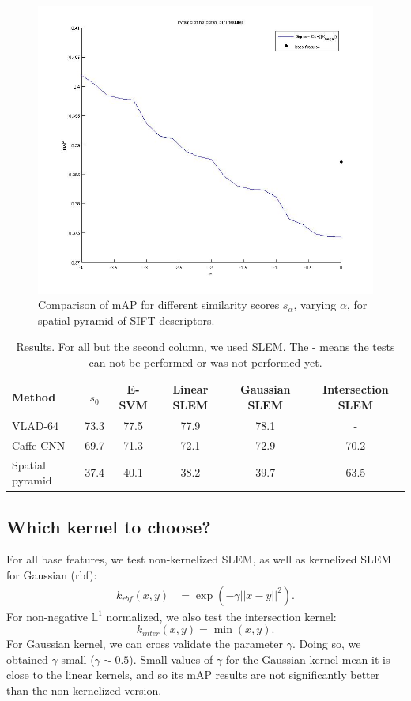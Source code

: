 \documentclass[10pt,twocolumn,letterpaper]{article}
\begin{document}
\begin{figure}
\centering
\includegraphics[width=.45\textwidth]{whitening_pyr.jpg}
\caption{Comparison of mAP for different similarity scores $s_{\alpha}$, varying $\alpha$, for spatial pyramid of SIFT descriptors.}
\label{salpha:pyr}
\end{figure}

\begin{table}[t]
\begin{center}
\begin{tabular}{|l|c|c|c|c|c|}
\hline
Method & $s_0$ & E-SVM \cite{ZePe15} &Linear SLEM & Gaussian SLEM &  Intersection SLEM \\
\hline\hline
VLAD-64 & 73.3 & 77.5 & 77.9 & 78.1 & -\\
Caffe CNN & 69.7 & 71.3 & 72.1 & 72.9 & 70.2\\
Spatial pyramid & 37.4 & 40.1 & 38.2 & 39.7 & 63.5\\
\hline
\end{tabular}
\end{center}
\caption{Results. For all but the second column, we used SLEM. The - means the tests can not be performed or was not performed yet.}
\end{table}
\subsection{Which kernel to choose?}
For all base features, we test non-kernelized SLEM, as well as kernelized SLEM for Gaussian (rbf):
\begin{align}
k_{rbf}(x,y) &= \exp\left(-\gamma||x-y||^2\right).%
\end{align}
For non-negative $\mathbb{L}^1$ normalized, we also test the intersection kernel: 
\begin{equation}
k_{inter}(x,y) = \min(x,y).
\end{equation}
For Gaussian kernel, we can cross validate the parameter $\gamma$. Doing so, we obtained $\gamma$ small ($\gamma\sim 0.5$). Small values of $\gamma$ for the Gaussian kernel mean it is close to the linear kernels, and so its mAP results are not significantly better than the non-kernelized version.
\end{document}
